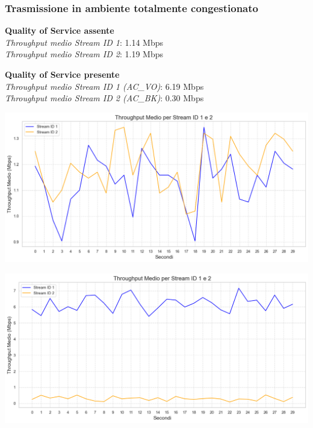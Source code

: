 \documentclass{beamer}
\begin{document}
\begin{frame}
    \frametitle{Trasmissione in ambiente totalmente congestionato}
    
    \begin{minipage}{0.45\textwidth}
        \textbf{Quality of Service assente}\\
        \textit{Throughput medio Stream ID 1}: 1.14 Mbps\\
        \textit{Throughput medio Stream ID 2}: 1.19 Mbps\\
        
        \vspace{1cm}
        
        \textbf{Quality of Service presente}\\
        \textit{Throughput medio Stream ID 1 (AC\_VO)}: 6.19 Mbps\\
        \textit{Throughput medio Stream ID 2 (AC\_BK)}: 0.30 Mbps\\
    \end{minipage}
    \hfill
    \begin{minipage}{0.5\textwidth}
        \centering
        \begin{minipage}{\textwidth}
            \includegraphics[width=\textwidth]{t1_c2_main.png}
            \vspace{0.5cm}
        \end{minipage}
        \begin{minipage}{\textwidth}
            \includegraphics[width=\textwidth]{t2_c2_main.png}
        \end{minipage}
    \end{minipage}

\end{frame}
\end{document}
